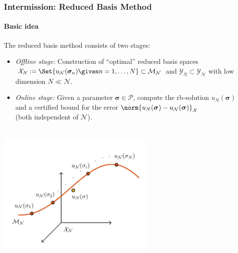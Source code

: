 \begin{frame}[t]
    \frametitle{Intermission: Reduced Basis Method}
    \framesubtitle{Basic idea}

    The reduced basis method consists of two stages:

    \begin{itemize}
        \item {} \emph{Offline stage:} Construction of \enquote{optimal} reduced basis spaces $\mathcal X_{N} := \Set{u_{\mathcal N}(\bm \sigma_n) \given n = 1, \dots, N} \subset \mathcal M_{\mathcal N}$ and $\mathcal Y_{N} \subset \mathcal Y_{\mathcal N}$ with low dimension $N \ll \mathcal N$.
        \item {} \emph{Online stage:} Given a parameter $\bm \sigma \in \mathcal P$, compute the rb-solution $u_{N}(\bm \sigma)$ and a certified bound for the error $\norm{u_{N}(\bm \sigma) - u_{\mathcal N}(\bm \sigma)}_{\mathcal X}$ \\(both independent of $\mathcal N$).
    \end{itemize}
    \centering
    $\;$\\[-3.7em]
     \includegraphics[width=0.58\textwidth]{figures/rb.pdf}
\end{frame}

